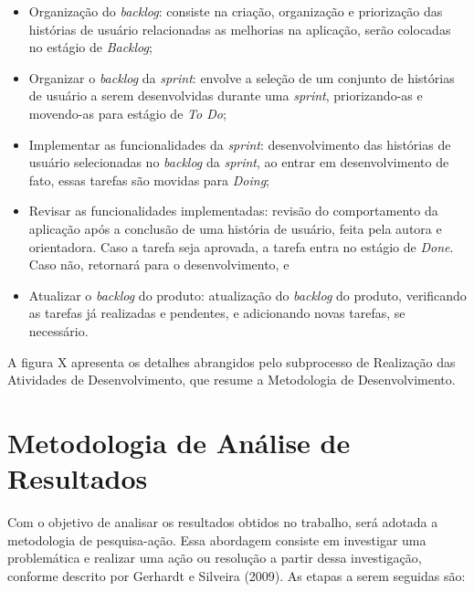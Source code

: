 \begin{itemize}
	\item Organização do \textit{backlog}: consiste na criação, organização e priorização das histórias de usuário relacionadas as melhorias na aplicação, serão colocadas no estágio de \textit{Backlog};
	\item Organizar o \textit{backlog} da \textit{sprint}: envolve a seleção de um conjunto de histórias de usuário a serem desenvolvidas durante uma \textit{sprint}, priorizando-as e movendo-as para estágio de \textit{To Do};
	\item Implementar as funcionalidades da \textit{sprint}: desenvolvimento das histórias de usuário selecionadas no \textit{backlog} da \textit{sprint}, ao entrar em desenvolvimento de fato, essas tarefas são movidas para \textit{Doing};
	\item Revisar as funcionalidades implementadas: revisão do comportamento da aplicação após a conclusão de uma história de usuário, feita pela autora e orientadora. Caso a tarefa seja aprovada, a tarefa entra no estágio de \textit{Done}. Caso não, retornará para o desenvolvimento, e
	\item Atualizar o \textit{backlog} do produto: atualização do \textit{backlog} do produto, verificando as tarefas já realizadas e pendentes, e adicionando novas tarefas, se necessário.
\end{itemize}

A figura X apresenta os detalhes abrangidos pelo subprocesso de Realização das Atividades de Desenvolvimento, que resume a Metodologia de Desenvolvimento.

\section{Metodologia de Análise de Resultados}
\label{sec:Metodologia de Analise de Resultados}
Com o objetivo de analisar os resultados obtidos no trabalho, será adotada a metodologia de pesquisa-ação. Essa abordagem consiste em investigar uma problemática e realizar uma ação ou resolução a partir dessa investigação, conforme descrito por Gerhardt e Silveira (2009). As etapas a 
serem seguidas são:

